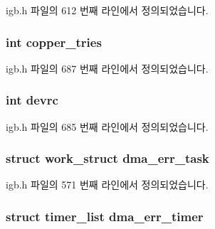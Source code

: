 igb.\+h 파일의 612 번째 라인에서 정의되었습니다.

\subsubsection[{\texorpdfstring{copper\+\_\+tries}{copper_tries}}]{\setlength{\rightskip}{0pt plus 5cm}int copper\+\_\+tries}\hypertarget{structigb__adapter_a3dbb691216c560668ca8304f557c8f88}{}\label{structigb__adapter_a3dbb691216c560668ca8304f557c8f88}


igb.\+h 파일의 687 번째 라인에서 정의되었습니다.

\subsubsection[{\texorpdfstring{devrc}{devrc}}]{\setlength{\rightskip}{0pt plus 5cm}int devrc}\hypertarget{structigb__adapter_ac0a0e7f06e849ba5ec750468922e2cdd}{}\label{structigb__adapter_ac0a0e7f06e849ba5ec750468922e2cdd}


igb.\+h 파일의 685 번째 라인에서 정의되었습니다.

\subsubsection[{\texorpdfstring{dma\+\_\+err\+\_\+task}{dma_err_task}}]{\setlength{\rightskip}{0pt plus 5cm}struct work\+\_\+struct dma\+\_\+err\+\_\+task}\hypertarget{structigb__adapter_a6cbe39db8d0f9cc3f2ab5180f975b468}{}\label{structigb__adapter_a6cbe39db8d0f9cc3f2ab5180f975b468}


igb.\+h 파일의 571 번째 라인에서 정의되었습니다.

\subsubsection[{\texorpdfstring{dma\+\_\+err\+\_\+timer}{dma_err_timer}}]{\setlength{\rightskip}{0pt plus 5cm}struct timer\+\_\+list dma\+\_\+err\+\_\+timer}\hypertarget{structigb__adapter_ac11a44ad73617c02ac826d263b35ed19}{}\label{structigb__adapter_ac11a44ad73617c02ac826d263b35ed19}


